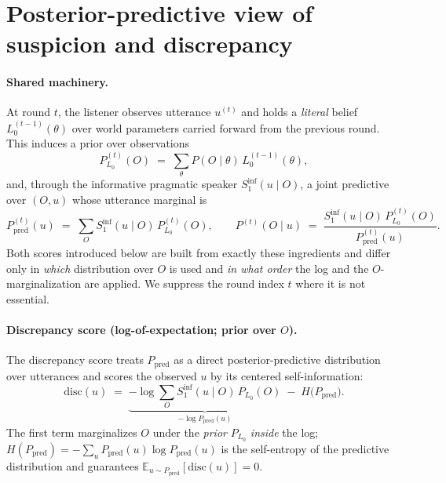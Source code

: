 
\section{Posterior-predictive view of suspicion and discrepancy}
\label{sec:posterior-predictive}

\paragraph{Shared machinery.}
At round $t$, the listener observes utterance $u^{(t)}$ and holds a
\emph{literal} belief $L_0^{(t-1)}(\theta)$ over world parameters carried
forward from the previous round.  This induces a prior over observations
\begin{equation}
  P_{L_0}^{(t)}(O) \;=\; \sum_{\theta} P(O\mid\theta)\, L_0^{(t-1)}(\theta),
  \label{eq:prior-O}
\end{equation}
and, through the informative pragmatic speaker
$S_1^{\mathrm{inf}}(u\mid O)$, a joint predictive over $(O,u)$ whose
utterance marginal is
\begin{equation}
  P_{\mathrm{pred}}^{(t)}(u) \;=\; \sum_{O} S_1^{\mathrm{inf}}(u\mid O)\, P_{L_0}^{(t)}(O),
  \qquad
  P^{(t)}(O\mid u) \;=\; \frac{S_1^{\mathrm{inf}}(u\mid O)\, P_{L_0}^{(t)}(O)}{P_{\mathrm{pred}}^{(t)}(u)}.
  \label{eq:pred-and-post}
\end{equation}
Both scores introduced below are built from exactly these ingredients and
differ only in \emph{which} distribution over $O$ is used and \emph{in what
order} the log and the $O$-marginalization are applied.  We suppress the
round index $t$ where it is not essential.

\paragraph{Discrepancy score (log-of-expectation; prior over $O$).}
The discrepancy score treats $P_{\mathrm{pred}}$ as a direct posterior-predictive
distribution over utterances and scores the observed $u$ by its centered
self-information:
\begin{equation}
  \boxed{\;
    \mathrm{disc}(u) \;=\; \underbrace{-\log \sum_{O} S_1^{\mathrm{inf}}(u\mid O)\, P_{L_0}(O)}_{-\log P_{\mathrm{pred}}(u)}
                 \;-\; H\!\bigl(P_{\mathrm{pred}}\bigr).\;}
  \label{eq:disc}
\end{equation}
The first term marginalizes $O$ under the \emph{prior} $P_{L_0}$ \emph{inside} the log;
$H(P_{\mathrm{pred}})=-\sum_u P_{\mathrm{pred}}(u)\log P_{\mathrm{pred}}(u)$
is the self-entropy of the predictive distribution and guarantees
$\mathbb{E}_{u\sim P_{\mathrm{pred}}}[\mathrm{disc}(u)] = 0$.


